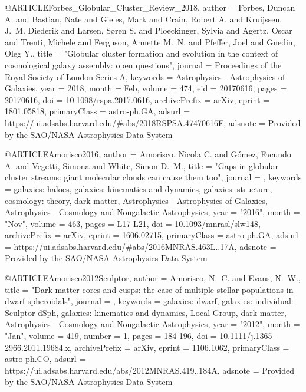 \documentclass[apj]{emulateapj}
\begin{document}
{{{{{{{{{{{{{{{@ARTICLE{Forbes_Globular_Cluster_Review_2018,
       author = {{Forbes}, Duncan A. and {Bastian}, Nate and {Gieles}, Mark and {Crain},
        Robert A. and {Kruijssen}, J.~M. Diederik and {Larsen}, S{\o}ren
        S. and {Ploeckinger}, Sylvia and {Agertz}, Oscar and {Trenti},
        Michele and {Ferguson}, Annette M.~N. and {Pfeffer}, Joel and
        {Gnedin}, Oleg Y.},
        title = "{Globular cluster formation and evolution in the context of cosmological galaxy assembly: open questions}",
      journal = {Proceedings of the Royal Society of London Series A},
     keywords = {Astrophysics - Astrophysics of Galaxies},
         year = 2018,
        month = Feb,
       volume = {474},
          eid = {20170616},
        pages = {20170616},
          doi = {10.1098/rspa.2017.0616},
archivePrefix = {arXiv},
       eprint = {1801.05818},
 primaryClass = {astro-ph.GA},
       adsurl = {https://ui.adsabs.harvard.edu/\#abs/2018RSPSA.47470616F},
      adsnote = {Provided by the SAO/NASA Astrophysics Data System}
}


@ARTICLE{Amorisco2016,
       author = {{Amorisco}, Nicola C. and {G{\'o}mez}, Facundo A. and {Vegetti}, Simona and
         {White}, Simon D.~M.},
        title = "{Gaps in globular cluster streams: giant molecular clouds can cause them too}",
      journal = {\mnras},
     keywords = {galaxies: haloes, galaxies: kinematics and dynamics, galaxies: structure, cosmology: theory, dark matter, Astrophysics - Astrophysics of Galaxies, Astrophysics - Cosmology and Nongalactic Astrophysics},
         year = "2016",
        month = "Nov",
       volume = {463},
        pages = {L17-L21},
          doi = {10.1093/mnrasl/slw148},
archivePrefix = {arXiv},
       eprint = {1606.02715},
 primaryClass = {astro-ph.GA},
       adsurl = {https://ui.adsabs.harvard.edu/\#abs/2016MNRAS.463L..17A},
      adsnote = {Provided by the SAO/NASA Astrophysics Data System}
}



@ARTICLE{Amorisco2012Sculptor,
       author = {{Amorisco}, N.~C. and {Evans}, N.~W.},
        title = "{Dark matter cores and cusps: the case of multiple stellar populations in dwarf spheroidals}",
      journal = {\mnras},
     keywords = {galaxies: dwarf, galaxies: individual: Sculptor dSph, galaxies: kinematics and dynamics, Local Group, dark matter, Astrophysics - Cosmology and Nongalactic Astrophysics},
         year = "2012",
        month = "Jan",
       volume = {419},
       number = {1},
        pages = {184-196},
          doi = {10.1111/j.1365-2966.2011.19684.x},
archivePrefix = {arXiv},
       eprint = {1106.1062},
 primaryClass = {astro-ph.CO},
       adsurl = {https://ui.adsabs.harvard.edu/abs/2012MNRAS.419..184A},
      adsnote = {Provided by the SAO/NASA Astrophysics Data System}
}




}}}}}}}}}}}}}}}
\end{document}
